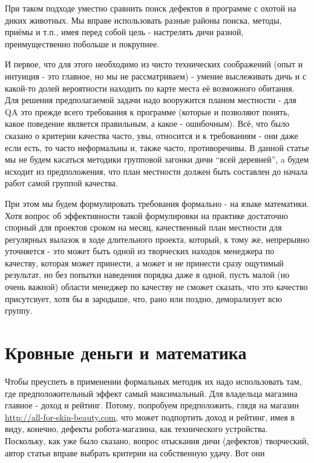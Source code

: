 \documentclass[a4paper]{book}
\def\tp{т.\thinspace п.}
\begin{document}
При таком подходе уместно сравнить поиск дефектов в программе с
охотой на диких животных. Мы вправе использовать разные районы
поиска, методы, приёмы и \tp, имея перед собой цель - настрелять
дичи разной, преимущественно побольше и покрупнее.

И первое, что для этого необходимо из чисто технических
соображений (опыт и интуиция - это главное, но мы не
рассматриваем) - умение выслеживать дичь и с какой-то долей
вероятности находить по карте места её возможного обитания.  Для
решения предполагаемой задачи надо вооружится планом местности -
для QA это прежде всего требования к программе (которые и
позволяют понять, какое поведение является правильным, а какое -
ошибочным). Всё, что было сказано о критерии качества часто, увы,
относится и к требованиям - они даже если есть, то часто
неформальны и, также часто, противоречивы. В данной статье мы не
будем касаться методики групповой загонки дичи ``всей деревней'',
a будем исходит из предположения, что план местности должен
быть составлен до начала работ самой группой качества.

При этом мы будем формулировать требования формально - на языке
математики. Хотя вопрос об эффективности такой формулировки на
практике достаточно спорный для проектов сроком на месяц,
качественный план местности для регулярных вылазок в ходе
длительного проекта, который, к тому же, непрерывно уточняется -
это может быть одной из творческих находок менеджера по качеству,
которая может принести, а может и не принести сразу ощутимый
результат, но без попытки наведения порядка даже в одной, пусть
малой (но очень важной) области менеджер по качеству не сможет
сказать, что это качество присутсвует, хотя бы в зародыше, что,
рано или поздно, деморализует всю группу.

\section{Кровные деньги и математика}

Чтобы преуспеть в применении формальных методик их надо
использовать там, где предположительный эффект самый
максимальный. Для владельца магазина главное - доход и
рейтинг. Потому, попробуем предположить, глядя на магазин
\url{http://all-for-skin-beauty.com}, что может подпортить доход
и рейтинг, имея в виду, конечно, дефекты робота-магазина, как
технического устройства. Поскольку, как уже было сказано, вопрос
отыскания дичи (дефектов) творческий, автор статьи вправе выбрать
критерии на собственную удачу. Вот они
\end{document}
